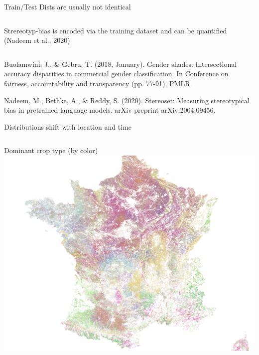 \documentclass[11pt]{beamer}
\newcommand{\citeapa}[1]{ {\tiny#1\par} }
\begin{document}
\begin{frame}{Train/Test Dists are usually not identical}
\begin{columns}[t]
				Strereotyp-bias is encoded via the training dataset and can be quantified {\scriptsize (Nadeem et al., 2020)}
			
		\end{columns}
		
		\vfill
	
		\citeapa{Buolamwini, J., \& Gebru, T. (2018, January). Gender shades: Intersectional accuracy disparities in commercial gender classification. In Conference on fairness, accountability and transparency (pp. 77-91). PMLR.}
		
		\citeapa{Nadeem, M., Bethke, A., \& Reddy, S. (2020). Stereoset: Measuring stereotypical bias in pretrained language models. arXiv preprint arXiv:2004.09456.}
	\end{frame}


	\begin{frame}{Distributions shift with location and time}
		\begin{columns}[t]
			Dominant crop type (by color)
			\includegraphics[width=\textwidth]{images/france_crop_distribution}
			

\end{columns}
\end{frame}
\end{document}
